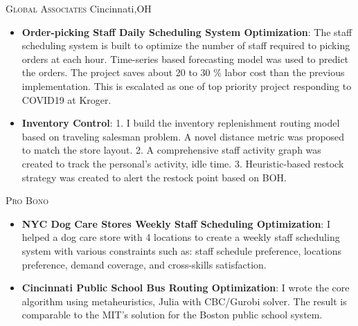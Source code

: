 \documentclass[12pt,letterpaper,roman]{moderncv} %
\begin{document}
\bigskip
{}
{\textsc{Global Associates} }{Cincinnati,OH}{}{}{
\begin{itemize}
\item \textbf{Order-picking Staff Daily Scheduling System Optimization}: 
The staff scheduling system is built to optimize the number of staff required to picking 
orders at each hour. Time-series based forecasting model was used to predict the orders. 
The project saves about  20 to 30 \% labor cost than the previous implementation. 
This is escalated as one of top priority project responding to COVID19 at Kroger.

\item \textbf{Inventory Control}:
1. I build the inventory replenishment routing model based on traveling salesman problem. 
A novel distance metric was proposed to match the store layout. 
2. A comprehensive staff activity graph was created to track the personal's activity, idle time. 
3. Heuristic-based restock strategy was created to alert the restock point based on BOH.


\end{itemize}
}

\bigskip

{\textsc{Pro Bono}}{}{}{}{
\begin{itemize}
\item \textbf{NYC Dog Care Stores Weekly Staff Scheduling Optimization}: I helped a dog 
care store with 4 locations to create a weekly staff scheduling system with various 
constraints such as: staff schedule preference, locations preference, demand coverage, and cross-skills satisfaction. 


\item \textbf{Cincinnati Public School Bus Routing Optimization}: I wrote the core 
 algorithm using metaheuristics, Julia with CBC/Gurobi solver.
  The result is comparable to the MIT's solution for the Boston public school system.
\end{itemize}
 
}




\end{document}
